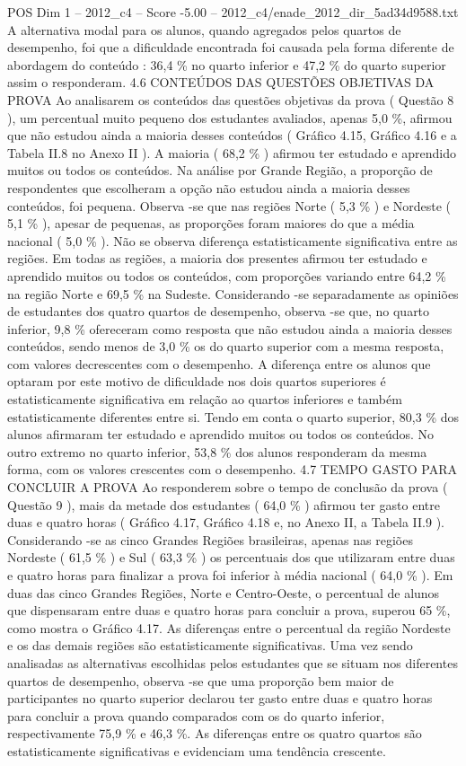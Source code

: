 \begin{textsample}{POS Dim 1 – 2012\_c4 – Score -5.00 – 2012\_c4/enade\_2012\_dir\_5ad34d9588.txt}
A alternativa modal para os alunos, quando agregados pelos quartos de desempenho, foi que a dificuldade encontrada foi causada pela forma diferente de abordagem do conteúdo : 36,4 \% no quarto inferior e 47,2 \% do quarto superior assim o responderam. 4.6 CONTEÚDOS DAS QUESTÕES OBJETIVAS DA PROVA Ao analisarem os conteúdos das questões objetivas da prova ( Questão 8 ), um percentual muito pequeno dos estudantes avaliados, apenas 5,0 \%, afirmou que não estudou ainda a maioria desses conteúdos ( Gráfico 4.15, Gráfico 4.16 e a Tabela II.8 no Anexo II ).
A maioria ( 68,2 \% ) afirmou ter estudado e aprendido muitos ou todos os conteúdos.
Na análise por Grande Região, a proporção de respondentes que escolheram a opção não estudou ainda a maioria desses conteúdos, foi pequena.
Observa -se que nas regiões Norte ( 5,3 \% ) e Nordeste ( 5,1 \% ), apesar de pequenas, as proporções foram maiores do que a média nacional ( 5,0 \% ).
Não se observa diferença estatisticamente significativa entre as regiões.
Em todas as regiões, a maioria dos presentes afirmou ter estudado e aprendido muitos ou todos os conteúdos, com proporções variando entre 64,2 \% na região Norte e 69,5 \% na Sudeste.
Considerando -se separadamente as opiniões de estudantes dos quatro quartos de desempenho, observa -se que, no quarto inferior, 9,8 \% ofereceram como resposta que não estudou ainda a maioria desses conteúdos, sendo menos de 3,0 \% os do quarto superior com a mesma resposta, com valores decrescentes com o desempenho.
A diferença entre os alunos que optaram por este motivo de dificuldade nos dois quartos superiores é estatisticamente significativa em relação ao quartos inferiores e também estatisticamente diferentes entre si.
Tendo em conta o quarto superior, 80,3 \% dos alunos afirmaram ter estudado e aprendido muitos ou todos os conteúdos.
No outro extremo no quarto inferior, 53,8 \% dos alunos responderam da mesma forma, com os valores crescentes com o desempenho. 4.7 TEMPO GASTO PARA CONCLUIR A PROVA Ao responderem sobre o tempo de conclusão da prova ( Questão 9 ), mais da metade dos estudantes ( 64,0 \% ) afirmou ter gasto entre duas e quatro horas ( Gráfico 4.17, Gráfico 4.18 e, no Anexo II, a Tabela II.9 ).
Considerando -se as cinco Grandes Regiões brasileiras, apenas nas regiões Nordeste ( 61,5 \% ) e Sul ( 63,3 \% ) os percentuais dos que utilizaram entre duas e quatro horas para finalizar a prova foi inferior à média nacional ( 64,0 \% ).
Em duas das cinco Grandes Regiões, Norte e Centro-Oeste, o percentual de alunos que dispensaram entre duas e quatro horas para concluir a prova, superou 65 \%, como mostra o Gráfico 4.17.
As diferenças entre o percentual da região Nordeste e os das demais regiões são estatisticamente significativas.
Uma vez sendo analisadas as alternativas escolhidas pelos estudantes que se situam nos diferentes quartos de desempenho, observa -se que uma proporção bem maior de participantes no quarto superior declarou ter gasto entre duas e quatro horas para concluir a prova quando comparados com os do quarto inferior, respectivamente 75,9 \% e 46,3 \%.
As diferenças entre os quatro quartos são estatisticamente significativas e evidenciam uma tendência crescente.

\end{textsample}
